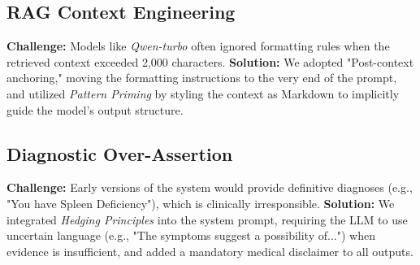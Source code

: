 \subsection{RAG Context Engineering}
\textbf{Challenge:} Models like \textit{Qwen-turbo} often ignored formatting rules when the retrieved context exceeded 2,000 characters.
\textbf{Solution:} We adopted "Post-context anchoring," moving the formatting instructions to the very end of the prompt, and utilized \textit{Pattern Priming} by styling the context as Markdown to implicitly guide the model's output structure.

\subsection{Diagnostic Over-Assertion}
\textbf{Challenge:} Early versions of the system would provide definitive diagnoses (e.g., "You have Spleen Deficiency"), which is clinically irresponsible.
\textbf{Solution:} We integrated \textit{Hedging Principles} into the system prompt, requiring the LLM to use uncertain language (e.g., "The symptoms suggest a possibility of...") when evidence is insufficient, and added a mandatory medical disclaimer to all outputs.
